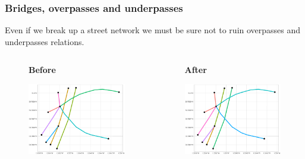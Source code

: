 \documentclass[c,10pt,pdftex]{beamer}
\begin{document}
\begin{frame}
\frametitle{Bridges, overpasses and underpasses}
\vspace{-0.75cm}
Even if we break up a street network we must be sure not to ruin overpasses and underpasses relations. 
\begin{columns}
	\begin{column}{0.5\linewidth}
		\begin{figure}
			\centering
			\large \textbf{Before} \par \medskip
			\includegraphics[width = \linewidth, trim = {4cm 0 3.75cm 0}, clip]{images/overpasses1}
		\end{figure}
	\end{column}
\begin{column}{0.5\linewidth}
	\begin{figure}
		\centering
		\large \textbf{After} \par \medskip
		\includegraphics[width = \linewidth, trim = {4cm 0 3.75cm 0}, clip]{images/overpasses2}
	\end{figure}
\end{column}
\end{columns}
\end{frame}
\end{document}
